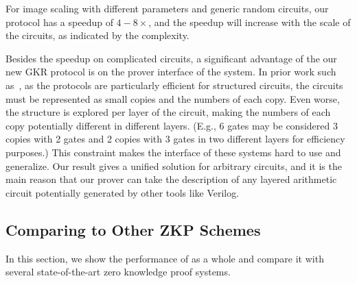 For image scaling with different parameters and generic random circuits, our protocol has a speedup of $4-8\times$, and the speedup will increase with the scale of the circuits, as indicated by the complexity.

Besides the speedup on complicated circuits, a significant advantage of the our new GKR protocol is on the prover interface of the system. In prior work such as~\cite{wahby2017full,vram}, as the protocols are particularly efficient for structured circuits, the circuits must be represented as small copies and the numbers of each copy. Even worse, the structure is explored per layer of the circuit, making the numbers of each copy potentially different in different layers. (E.g., 6 gates may be considered 3 copies with 2 gates and 2 copies with 3 gates in two different layers for efficiency purposes.) This constraint makes the interface of these systems hard to use and generalize. Our result gives a unified solution for arbitrary circuits, and it is the main reason that our prover can take the description of any layered arithmetic circuit potentially generated by other tools like Verilog. 


\subsection{Comparing to Other ZKP Schemes}\label{subsec:expZKP}

In this section, we show the performance of \name as a whole and compare it with several state-of-the-art zero knowledge proof systems.

